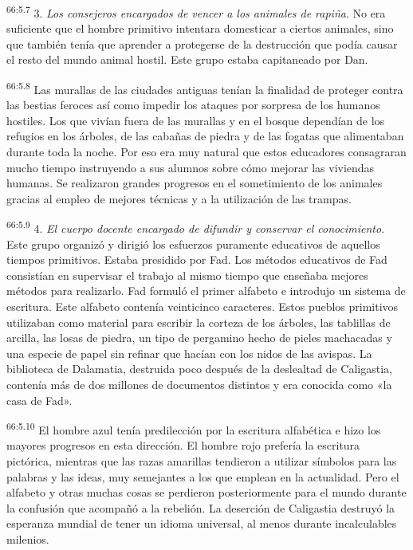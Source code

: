\par
\textsuperscript{66:5.7} 3. \textit{Los consejeros encargados de vencer a los animales de rapiña}. No era suficiente que el hombre primitivo intentara domesticar a ciertos animales, sino que también tenía que aprender a protegerse de la destrucción que podía causar el resto del mundo animal hostil. Este grupo estaba capitaneado por Dan.

\par
\textsuperscript{66:5.8} Las murallas de las ciudades antiguas tenían la finalidad de proteger contra las bestias feroces así como impedir los ataques por sorpresa de los humanos hostiles. Los que vivían fuera de las murallas y en el bosque dependían de los refugios en los árboles, de las cabañas de piedra y de las fogatas que alimentaban durante toda la noche. Por eso era muy natural que estos educadores consagraran mucho tiempo instruyendo a sus alumnos sobre cómo mejorar las viviendas humanas. Se realizaron grandes progresos en el sometimiento de los animales gracias al empleo de mejores técnicas y a la utilización de las trampas.

\par
\textsuperscript{66:5.9} 4. \textit{El cuerpo docente encargado de difundir y conservar el conocimiento}. Este grupo organizó y dirigió los esfuerzos puramente educativos de aquellos tiempos primitivos. Estaba presidido por Fad. Los métodos educativos de Fad consistían en supervisar el trabajo al mismo tiempo que enseñaba mejores métodos para realizarlo. Fad formuló el primer alfabeto e introdujo un sistema de escritura. Este alfabeto contenía veinticinco caracteres. Estos pueblos primitivos utilizaban como material para escribir la corteza de los árboles, las tablillas de arcilla, las losas de piedra, un tipo de pergamino hecho de pieles machacadas y una especie de papel sin refinar que hacían con los nidos de las avispas. La biblioteca de Dalamatia, destruida poco después de la deslealtad de Caligastia, contenía más de dos millones de documentos distintos y era conocida como «la casa de Fad».

\par
\textsuperscript{66:5.10} El hombre azul tenía predilección por la escritura alfabética e hizo los mayores progresos en esta dirección. El hombre rojo prefería la escritura pictórica, mientras que las razas amarillas tendieron a utilizar símbolos para las palabras y las ideas, muy semejantes a los que emplean en la actualidad. Pero el alfabeto y otras muchas cosas se perdieron posteriormente para el mundo durante la confusión que acompañó a la rebelión. La deserción de Caligastia destruyó la esperanza mundial de tener un idioma universal, al menos durante incalculables milenios.

